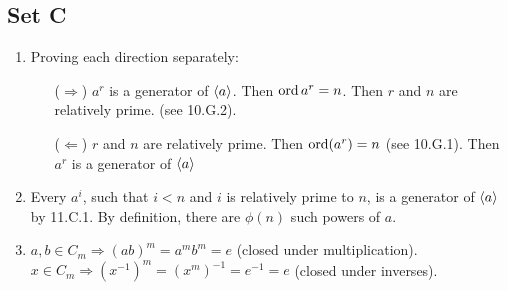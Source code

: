 \subsection{Set C}
\begin{enumerate}
    \item Proving each direction separately:
        \begin{enumerate}
            \item [($\Rightarrow$)] $a^r$ is a generator of $\langle a\rangle$. Then $\operatorname{ord}{a^r} = n$. Then $r$ and $n$ are relatively prime. (see 10.G.2).
            \item [($\Leftarrow$)] $r$ and $n$ are relatively prime. Then $\operatorname{ord}(a^r) = n$ (see 10.G.1). Then $a^r$ is a generator of $\langle a\rangle$
        \end{enumerate}
    \item Every $a^i$, such that $i < n$ and $i$ is relatively prime to $n$, is a  generator of $\langle a\rangle$ by 11.C.1. By definition, there are $\phi(n)$ such powers of $a$. 
    \item $a, b \in C_m \Rightarrow (ab)^m = a^mb^m = e$ (closed under multiplication). $x \in C_m \Rightarrow (x^{-1})^m = (x^m)^{-1} = e^{-1} = e$ (closed under inverses).
\end{enumerate}
